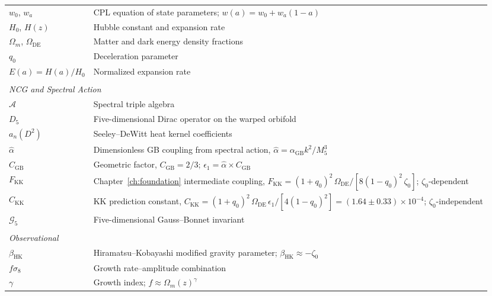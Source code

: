 \documentclass[10pt,a4paper,openany,twocolumn]{book}
\theoremstyle{definition}
\theoremstyle{remark}
\begin{document}
\begin{longtable}{l p{10cm}}
$w_0$, $w_a$ & CPL equation of state parameters; $w(a) = w_0 + w_a(1-a)$ \\
$H_0$, $H(z)$ & Hubble constant and expansion rate \\
$\Omega_m$, $\Omega_{\mathrm{DE}}$ & Matter and dark energy density fractions \\
$q_0$ & Deceleration parameter \\
$E(a) = H(a)/H_0$ & Normalized expansion rate \\
\\
\multicolumn{2}{l}{\textit{NCG and Spectral Action}} \\
$\mathcal{A}$ & Spectral triple algebra \\
$D_5$ & Five-dimensional Dirac operator on the warped orbifold \\
$a_n(D^2)$ & Seeley--DeWitt heat kernel coefficients \\
$\hat{\alpha}$ & Dimensionless GB coupling from spectral action, $\hat{\alpha} = \alpha_{\mathrm{GB}} k^2/M_5^3$ \\
$C_{\mathrm{GB}}$ & Geometric factor, $C_{\mathrm{GB}} = 2/3$; $\epsilon_1 = \hat{\alpha} \times C_{\mathrm{GB}}$ \\
$F_{\mathrm{KK}}$ & Chapter~\ref{ch:foundation} intermediate coupling, $F_{\mathrm{KK}} = (1{+}q_0)^2\,\Omega_{\mathrm{DE}}/[8(1{-}q_0)^2\,\zeta_0]$; $\zeta_0$-dependent \\
$C_{\mathrm{KK}}$ & KK prediction constant, $C_{\mathrm{KK}} = (1{+}q_0)^2\,\Omega_{\mathrm{DE}}\,\epsilon_1/[4(1{-}q_0)^2] = (1.64 \pm 0.33) \times 10^{-4}$; $\zeta_0$-independent \\
$\mathcal{G}_5$ & Five-dimensional Gauss--Bonnet invariant \\
\\
\multicolumn{2}{l}{\textit{Observational}} \\
$\beta_{\mathrm{HK}}$ & Hiramatsu--Kobayashi modified gravity parameter; $\beta_{\mathrm{HK}} \approx -\zeta_0$ \\
$f\sigma_8$ & Growth rate--amplitude combination \\
$\gamma$ & Growth index; $f \approx \Omega_m(z)^\gamma$ \\
\end{longtable}

\mainmatter

\setcounter{chapter}{-1}


\cleardoublepage
\twocolumn
\end{document}
